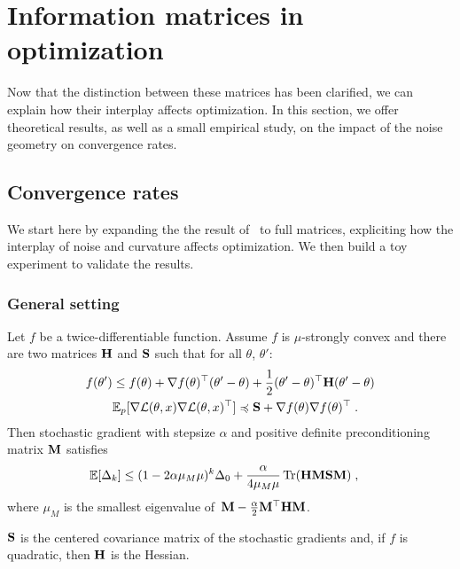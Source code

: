 \section{Information matrices in optimization}
\label{sec:optimization}
Now that the distinction between these matrices has been clarified, we can explain how their interplay affects optimization. In this section, we offer theoretical results, as well as a small empirical study, on the impact of the noise geometry on convergence rates.

\subsection{Convergence rates}
We start here by expanding the the result of~\citet{schmidt2014convergence} to full matrices, expliciting how the interplay of noise and curvature affects optimization. We then build a toy experiment to validate the results.

\subsubsection{General setting}

\begin{proposition}
\label{prop:function_value}
Let $f$ be a twice-differentiable function. Assume $f$ is $\mu$-strongly convex and there are two matrices ${\mathbf{H}}$ and ${\mathbf{S}}$ such that for all $\theta$, $\theta'$:
\begin{align*}
    f(\theta') &\leq f(\theta) + \nabla f(\theta)^\top(\theta' - \theta) + \frac{1}{2} (\theta' - \theta)^\top {\mathbf{H}} (\theta' - \theta)\\
    &\mathbb{E}_p[\nabla \mathcal{L} (\theta, x) \nabla \mathcal{L} (\theta, x)^\top] \preccurlyeq {\mathbf{S}} + \nabla f(\theta) \nabla f(\theta)^\top\; .
\end{align*}
Then stochastic gradient with stepsize $\alpha$ and positive definite preconditioning matrix ${\mathbf{M}}$ satisfies
\begin{align*}
    \mathbb{E} [\Delta_k]   &\leq (1 - 2\alpha\mu_M\mu)^k \Delta_0 + \frac{\alpha}{4\mu_{M} \mu }\operatorname{Tr}({\mathbf{H}} {\mathbf{M}} {\mathbf{S}} {\mathbf{M}}) \; ,
\end{align*}
where $\mu_M$ is the smallest eigenvalue of\, ${\mathbf{M}} - \frac{\alpha}{2} {\mathbf{M}}^\top {\mathbf{H}} {\mathbf{M}}$.
\end{proposition}

${\mathbf{S}}$ is the centered covariance matrix of the stochastic gradients and, if $f$ is quadratic, then ${\mathbf{H}}$ is the Hessian.




